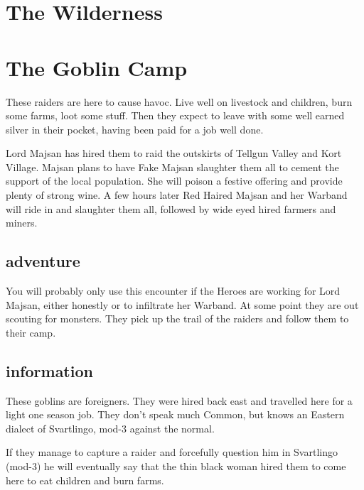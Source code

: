 \section*{The Wilderness}



\section*{The Goblin Camp}
These raiders are here to cause havoc. Live well on livestock and children, burn some farms, loot some stuff. Then they expect to leave with some well earned silver in their pocket, having been paid for a job well done.

Lord Majsan has hired them to raid the outskirts of Tellgun Valley and Kort Village. Majsan plans to have Fake Majsan slaughter them all to cement the support of the local population. She will poison a festive offering and provide plenty of strong wine. A few hours later Red Haired Majsan and her Warband will ride in and slaughter them all, followed by wide eyed hired farmers and miners.


\subsection*{adventure}
You will probably only use this encounter if the Heroes are working for Lord Majsan, either honestly or to infiltrate her Warband. At some point they are out scouting for monsters. They pick up the trail of the raiders and follow them to their camp.


\subsection*{information}
These goblins are foreigners. They were hired back east and travelled here for a light one season job. They don't speak much Common, but knows an Eastern dialect of Svartlingo, mod-3 against the normal.

If they manage to capture a raider and forcefully question him in Svartlingo (mod-3) he will eventually say that the thin black woman hired them to come here to eat children and burn farms.


